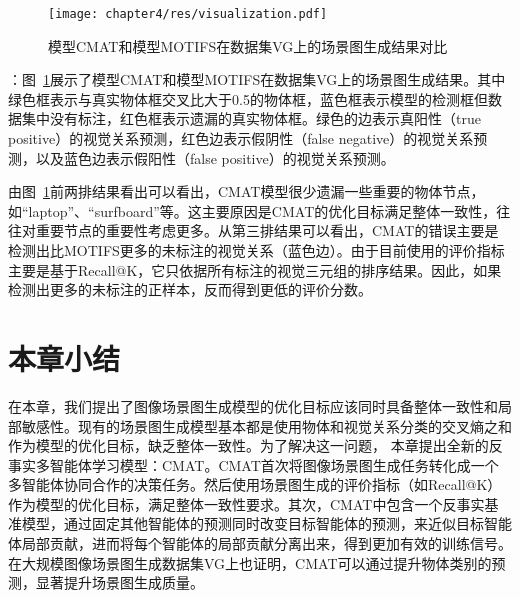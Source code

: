 \begin{figure}[t]
    \centering
    \texttt{[image: chapter4/res/visualization.pdf]}
    \caption{模型CMAT和模型MOTIFS在数据集VG上的场景图生成结果对比}
    \label{ch4:fig:visualization}
\end{figure}

\textbf{}：图~\ref{ch4:fig:visualization}展示了模型CMAT和模型MOTIFS在数据集VG上的场景图生成结果。其中绿色框表示与真实物体框交叉比大于0.5的物体框，蓝色框表示模型的检测框但数据集中没有标注，红色框表示遗漏的真实物体框。绿色的边表示真阳性（true positive）的视觉关系预测，红色边表示假阴性（false negative）的视觉关系预测，以及蓝色边表示假阳性（false positive）的视觉关系预测。

由图~\ref{ch4:fig:visualization}前两排结果看出可以看出，CMAT模型很少遗漏一些重要的物体节点，如“laptop”、“surfboard”等。这主要原因是CMAT的优化目标满足整体一致性，往往对重要节点的重要性考虑更多。从第三排结果可以看出，CMAT的错误主要是检测出比MOTIFS更多的未标注的视觉关系（蓝色边）。由于目前使用的评价指标主要是基于Recall@K，它只依据所有标注的视觉三元组的排序结果。因此，如果检测出更多的未标注的正样本，反而得到更低的评价分数。


\section{本章小结}

在本章，我们提出了图像场景图生成模型的优化目标应该同时具备整体一致性和局部敏感性。现有的场景图生成模型基本都是使用物体和视觉关系分类的交叉熵之和作为模型的优化目标，缺乏整体一致性。为了解决这一问题，
本章提出全新的反事实多智能体学习模型：CMAT。CMAT首次将图像场景图生成任务转化成一个多智能体协同合作的决策任务。然后使用场景图生成的评价指标（如Recall@K）作为模型的优化目标，满足整体一致性要求。其次，CMAT中包含一个反事实基准模型，通过固定其他智能体的预测同时改变目标智能体的预测，来近似目标智能体局部贡献，进而将每个智能体的局部贡献分离出来，得到更加有效的训练信号。在大规模图像场景图生成数据集VG上也证明，CMAT可以通过提升物体类别的预测，显著提升场景图生成质量。
